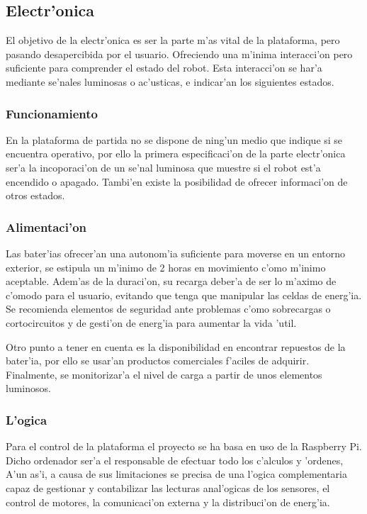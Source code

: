 \documentclass[twoside]{article}
\begin{document}
\subsection{Electr'onica}
El objetivo de la electr'onica es ser la parte m'as vital de la plataforma, pero pasando desapercibida por el usuario. Ofreciendo una m'inima interacci'on pero suficiente para comprender el estado del robot. Esta interacci'on se har'a mediante se'nales luminosas o ac'usticas, e indicar'an los siguientes estados.

\subsubsection{Funcionamiento}
En la plataforma de partida no se dispone de ning'un medio que indique si se encuentra operativo, por ello la primera especificaci'on de la parte electr'onica ser'a la incoporaci'on de un se'nal luminosa que muestre si el robot est'a encendido o apagado. Tambi'en existe la posibilidad de ofrecer informaci'on de otros estados.

\subsubsection{Alimentaci'on}
Las bater'ias ofrecer'an  una autonom'ia suficiente para moverse en un entorno exterior, se estipula un m'inimo de 2 horas en movimiento c'omo m'inimo aceptable. Adem'as de la duraci'on, su recarga deber'a de ser lo m'aximo de c'omodo para el usuario, evitando que tenga que manipular las celdas de energ'ia. Se recomienda elementos de seguridad ante problemas c'omo sobrecargas o cortocircuitos y de gesti'on de energ'ia para aumentar la vida 'util.

Otro punto a tener en cuenta es la disponibilidad en encontrar repuestos de la bater'ia, por ello se usar'an productos comerciales f'aciles de adquirir. Finalmente, se monitorizar'a el nivel de carga a partir de unos elementos luminosos.

\subsubsection{L'ogica}
Para el control de la plataforma el proyecto se ha basa en uso de la Raspberry Pi. Dicho ordenador ser'a el responsable de efectuar todo los c'alculos y 'ordenes, A'un as'i, a causa de sus limitaciones se precisa de una l'ogica complementaria capaz de gestionar y contabilizar las lecturas anal'ogicas de los sensores, el control de motores, la comunicaci'on externa y la distribuci'on de energ'ia.
\end{document}
